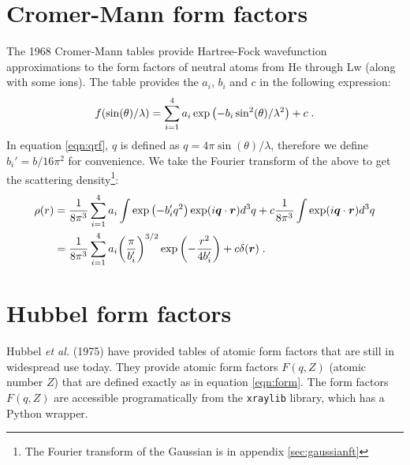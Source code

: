 \documentclass[11pt]{article}
\renewcommand{\vec}[1]{\boldsymbol{#1}}
\begin{document}
% 

\section{Cromer-Mann form factors}

The 1968 Cromer-Mann \cite{Cromer1968} tables provide Hartree-Fock wavefunction approximations to the 
form factors of neutral atoms from He through Lw (along with some ions).  The table provides the $a_i$, $b_i$ and $c$ in the following expression:
\begin{align}
 f(\sin(\theta)/\lambda)=\sum_{i=1}^4 a_i \exp\qty(-b_i \sin^2(\theta)/\lambda^2) + c \;.
\end{align}
In equation \ref{eqn:qrf}, $q$ is defined as $q=4\pi \sin(\theta)/\lambda$, 
therefore we define $b_i' = b/16\pi^2$ for convenience.  We take the Fourier 
transform of the above to get the scattering density\footnote{The Fourier 
transform of the Gaussian is in appendix \ref{sec:gaussianft}}:
\begin{align}
 \rho(r) &= \frac{1}{8\pi^3} \sum_{i=1}^4 a_i\int   \exp\qty(-b'_i q^2)\exp(i\vec{q}\cdot\vec{r})d^3q + c\frac{1}{8\pi^3}\int \exp(i\vec{q}\cdot\vec{r}) d^3q \\
  &= \frac{1}{8\pi^3}\sum_{i=1}^4 a_i\qty(\frac{\pi}{b'_i})^{3/2}\exp\qty(-\frac{r^2}{4b'_i}) + c\delta(\vec{r})\;.
 \end{align}


\section{Hubbel form factors}

Hubbel {\itshape et al.} (1975)\cite{hubbellAtomicFormFactors1975} have provided tables of atomic form factors that are
still in widespread use today.  They provide atomic form factors $F(q,Z)$ (atomic number $Z$) that are defined exactly
as in equation \ref{eqn:form}.
The form factors $F(q,Z)$ are accessible programatically from the  \texttt{xraylib} library, which has a Python wrapper.
\end{document}
